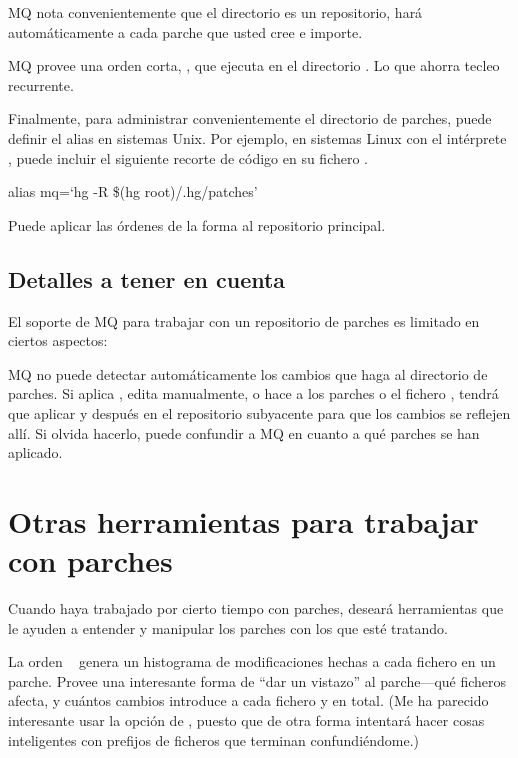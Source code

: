 MQ nota convenientemente que el directorio 
es un repositorio, hará  automáticamente a cada parche que
usted cree e importe.

MQ provee una orden corta, , que ejecuta
 en el directorio .  Lo que ahorra
tecleo recurrente.

Finalmente, para administrar convenientemente el directorio de
parches, puede definir el alias  en sistemas Unix.  Por
ejemplo, en sistemas Linux con el intérprete , puede
incluir el siguiente recorte de código en su fichero
.

\begin{codesample2}
  alias mq=`hg -R \$(hg root)/.hg/patches'
\end{codesample2}

Puede aplicar las órdenes de la forma  al
repositorio principal.

\subsection{Detalles a tener en cuenta}

El soporte de MQ para trabajar con un repositorio de parches es
limitado en ciertos aspectos:

MQ no puede detectar automáticamente los cambios que haga al
directorio de parches.  Si aplica , edita manualmente, o
hace  a los parches o el fichero ,
tendrá que aplicar  y después
 en el repositorio subyacente
para que los cambios se reflejen allí.  Si olvida hacerlo, puede
confundir a MQ en cuanto a qué parches se han aplicado.

\section{Otras herramientas para trabajar con parches}
\label{sec:mq:tools}

Cuando haya trabajado por cierto tiempo con parches, deseará
herramientas que le ayuden a entender y manipular los parches con los
que esté tratando.

La orden ~\cite{web:diffstat} genera un histograma
de modificaciones hechas a cada fichero en un parche.  Provee una
interesante forma de ``dar un vistazo'' al parche---qué ficheros
afecta, y cuántos cambios introduce a cada fichero y en total.  (Me ha
parecido interesante usar la opción  de
, puesto que de otra forma intentará hacer cosas
inteligentes con prefijos de ficheros que terminan confundiéndome.)


